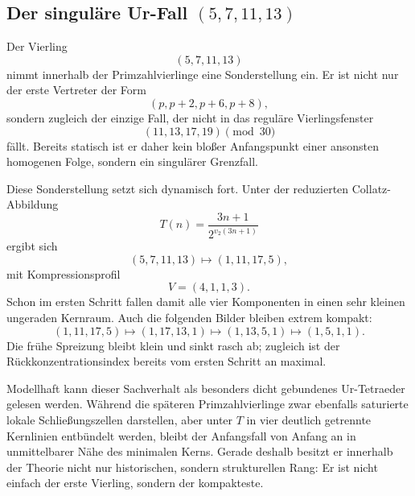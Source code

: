 
\subsection{Der singul\"are Ur-Fall $(5,7,11,13)$}

Der Vierling
\[
(5,7,11,13)
\]
nimmt innerhalb der Primzahlvierlinge eine Sonderstellung ein. Er ist
nicht nur der erste Vertreter der Form
\[
(p,p+2,p+6,p+8),
\]
sondern zugleich der einzige Fall, der nicht in das regul\"are
Vierlingsfenster
\[
(11,13,17,19)\pmod{30}
\]
f\"allt. Bereits statisch ist er daher kein blo\ss er Anfangspunkt einer
ansonsten homogenen Folge, sondern ein singul\"arer Grenzfall.

Diese Sonderstellung setzt sich dynamisch fort. Unter der reduzierten
Collatz-Abbildung
\[
T(n)=\frac{3n+1}{2^{v_2(3n+1)}}
\]
ergibt sich
\[
(5,7,11,13)\mapsto(1,11,17,5),
\]
mit Kompressionsprofil
\[
V=(4,1,1,3).
\]
Schon im ersten Schritt fallen damit alle vier Komponenten in einen sehr
kleinen ungeraden Kernraum. Auch die folgenden Bilder bleiben extrem
kompakt:
\[
(1,11,17,5)\mapsto(1,17,13,1)\mapsto(1,13,5,1)\mapsto(1,5,1,1).
\]
Die fr\"uhe Spreizung bleibt klein und sinkt rasch ab; zugleich ist der
R\"uckkonzentrationsindex bereits vom ersten Schritt an maximal.

Modellhaft kann dieser Sachverhalt als besonders dicht gebundenes
Ur-Tetraeder gelesen werden. W\"ahrend die sp\"ateren Primzahlvierlinge
zwar ebenfalls saturierte lokale Schlie\ss ungszellen darstellen, aber
unter $T$ in vier deutlich getrennte Kernlinien entb\"undelt werden,
bleibt der Anfangsfall von Anfang an in unmittelbarer N\"ahe des
minimalen Kerns. Gerade deshalb besitzt er innerhalb der Theorie nicht
nur historischen, sondern strukturellen Rang: Er ist nicht einfach der
erste Vierling, sondern der kompakteste.
